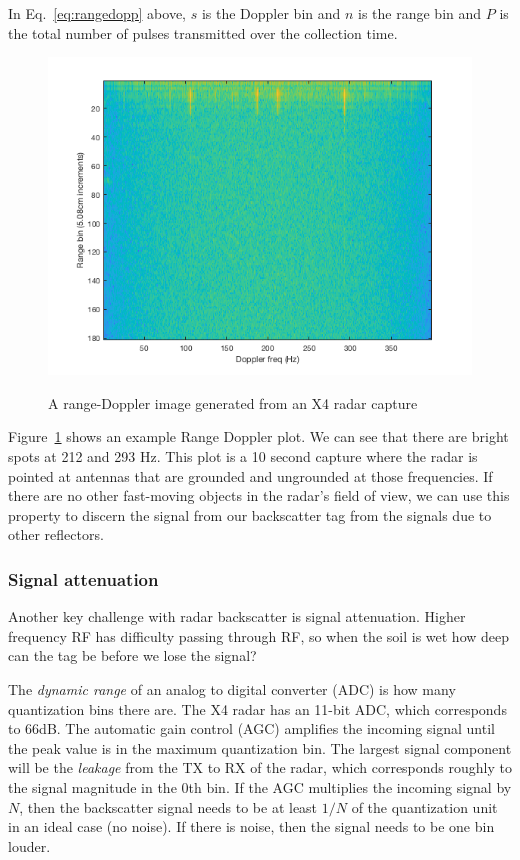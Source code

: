 \documentclass[12pt]{article}
\begin{document}
In Eq.~\ref{eq:rangedopp} above, $s$ is the Doppler bin and $n$ is
the range bin and $P$ is the total number of pulses transmitted over
the collection time. 

\begin{figure}[h!]
  \centering
  \includegraphics[scale=0.5]{rangedoppler.png}\\
  \caption{A range-Doppler image generated from an X4 radar capture}
  \label{figure:rdplot}
\end{figure}

Figure~\ref{figure:rdplot} shows an example Range Doppler plot. We can
see that there are bright spots at 212 and 293 Hz. This plot is a 10
second capture where the radar is pointed at antennas that are
grounded and ungrounded at those frequencies. If there are no other
fast-moving objects in the radar's field of view, we can use this
property to discern the signal from our backscatter tag from the
signals due to other reflectors.

\subsubsection*{Signal attenuation}

Another key challenge with radar backscatter is signal
attenuation. Higher frequency RF has difficulty passing through RF, so
when the soil is wet how deep can the tag be before we lose the
signal?

The \emph{dynamic range} of an analog to digital converter (ADC) is
how many quantization bins there are. The X4 radar has an 11-bit ADC,
which corresponds to 66dB. The automatic gain control (AGC) amplifies
the incoming signal until the peak value is in the maximum
quantization bin. The largest signal component will be the
\emph{leakage} from the TX to RX of the radar, which corresponds
roughly to the signal magnitude in the 0th bin. If the AGC multiplies
the incoming signal by $N$, then the backscatter signal needs to be at
least $1/N$ of the quantization unit in an ideal case (no noise). If
there is noise, then the signal needs to be one bin louder.
\end{document}
